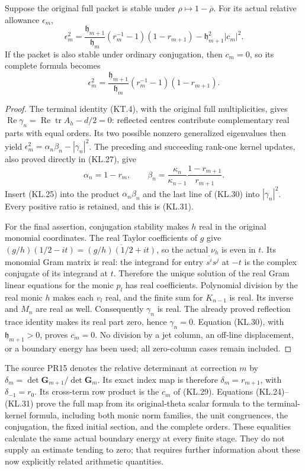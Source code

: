 \begin{theorem}
Suppose the original full packet is stable under
\(\rho\mapsto1-\overline\rho\).  For its actual relative
allowance \(\epsilon_m\),
\[
 \boxed{\epsilon_m^2=
  \frac{\mathfrak h_{m+1}}{\mathfrak h_m}
       (r_m^{-1}-1)(1-r_{m+1})
       -\mathfrak h_{m+1}^2|c_m|^2.}                  \tag{KL.31}
\]
If the packet is also stable under ordinary conjugation, then
\(c_m=0\), so its complete formula becomes
\[
 \boxed{\epsilon_m^2=
  \frac{\mathfrak h_{m+1}}{\mathfrak h_m}
                  (r_m^{-1}-1)(1-r_{m+1}).}            \tag{KL.32}
\]
\end{theorem}
\begin{proof}
The terminal identity (KT.4), with the original full multiplicities,
gives
\(\operatorname{Re}\gamma_n=
\operatorname{Re}\operatorname{tr}A_h-d/2=0\): reflected
centres contribute complementary real parts with equal orders.
Its two possible nonzero generalized eigenvalues then yield
\(\epsilon_m^2=\alpha_n\beta_n-|\gamma_n|^2\).
The preceding and succeeding rank-one kernel updates, also proved
directly in (KL.27), give
\[
 \alpha_n=1-r_m,\qquad
 \beta_n=\frac{\kappa_n}{\kappa_{n-1}}
                              \frac{1-r_{m+1}}{r_{m+1}}.
\]
Insert (KL.25) into the product \(\alpha_n\beta_n\) and
the last line of (KL.30) into \(|\gamma_n|^2\).  Every positive
ratio is retained, and this is (KL.31).

For the final assertion, conjugation stability makes \(h\) real
in the original monomial coordinates.  The real Taylor coefficients
of \(g\) give
\((g/h)(1/2-it)=\overline{(g/h)(1/2+it)}\), so the actual
\(\nu_h\) is even in \(t\).  Its monomial Gram matrix is real:
the integrand for entry \(\overline{s^i}s^j\) at \(-t\) is
the complex conjugate of its integrand at \(t\).  Therefore the
unique solution of the real Gram linear equations for the monic
\(p_l\) has real coefficients.  Polynomial division by the real
monic \(h\) makes each \(v_l\) real, and the finite sum for
\(K_{n-1}\) is real.  Its inverse and \(M_n\) are real as well.
Consequently \(\gamma_n\) is real.  The already proved reflection
trace identity makes its real part zero, hence \(\gamma_n=0\).
Equation (KL.30), with \(\mathfrak h_{m+1}>0\), proves
\(c_m=0\).  No division by a jet column, an off-line displacement,
or a boundary energy has been used; all zero-column cases remain
included.
\end{proof}

The source PR15 denotes the relative determinant at correction
\(m\) by \(\delta_m=\det\mathbf G_{m+1}/\det\mathbf G_m\).
Its exact index map is therefore \(\delta_m=r_{m+1}\), with
\(\delta_{-1}=r_0\).  Its cross-term row product is the
\(c_m\) of (KL.29).  Equations (KL.24)--(KL.31) prove the full
map from its original-theta scalar formula to the terminal-kernel
formula, including both monic norm families, the unit congruences,
the conjugation, the fixed initial section, and the complete orders.
These equalities calculate the same actual boundary energy at every
finite stage.  They do not supply an estimate tending to zero; that
requires further information about these now explicitly related
arithmetic quantities.


